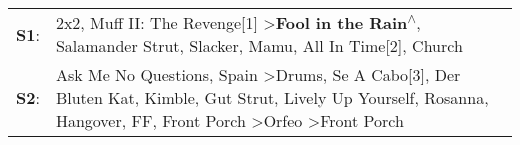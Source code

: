 \begin{supertabular}{p{0.03\textwidth}p{0.92\textwidth}}
 \textbf{S1}:  &                                                                                                                                                                                                                                  2x2\textsuperscript{}, \enspace Muff II: The Revenge[1]\textsuperscript{} \textgreater \enspace \textbf{Fool in the Rain\textsuperscript{$\wedge$}}, \enspace Salamander Strut\textsuperscript{}, \enspace Slacker\textsuperscript{}, \enspace Mamu\textsuperscript{}, \enspace All In Time[2]\textsuperscript{}, \enspace Church\textsuperscript{}  \enspace  \\
 \textbf{S2}:  &  Ask Me No Questions\textsuperscript{}, \enspace Spain\textsuperscript{} \textgreater \enspace Drums\textsuperscript{}, \enspace Se A Cabo[3]\textsuperscript{}, \enspace Der Bluten Kat\textsuperscript{}, \enspace Kimble\textsuperscript{}, \enspace Gut Strut\textsuperscript{}, \enspace Lively Up Yourself\textsuperscript{}, \enspace Rosanna\textsuperscript{}, \enspace Hangover\textsuperscript{}, \enspace FF\textsuperscript{}, \enspace Front Porch\textsuperscript{} \textgreater \enspace Orfeo\textsuperscript{} \textgreater \enspace Front Porch\textsuperscript{}  \enspace  \\
\end{supertabular}
